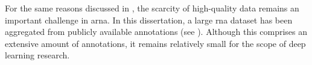 

For the same reasons discussed in
, the scarcity of high-quality
data remains an important challenge in \gls{arna}. In this
dissertation, a large \gls{rna} dataset has been aggregated
from publicly available annotations (see
). Although this comprises
an extensive amount of annotations, it remains relatively
small for the scope of deep learning research.
